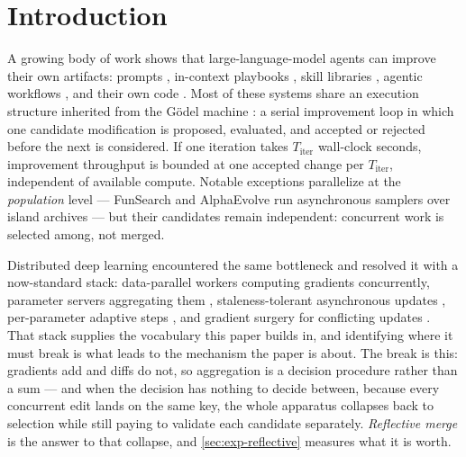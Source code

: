\documentclass{article}
\begin{document}

\section{Introduction}
\label{sec:intro}

A growing body of work shows that large-language-model agents can improve their own artifacts: prompts \citep{fernando2023promptbreeder,agrawal2025gepa}, in-context playbooks \citep{zhang2025ace}, skill libraries \citep{wang2023voyager,zheng2025skillweaver}, agentic workflows \citep{zhang2024aflow,hu2024adas}, and their own code \citep{zhang2025dgm,robeyns2025sica,yin2024godel}. Most of these systems share an execution structure inherited from the G\"odel machine \citep{schmidhuber2003godel}: a serial improvement loop in which one candidate modification is proposed, evaluated, and accepted or rejected before the next is considered. If one iteration takes $T_{\mathrm{iter}}$ wall-clock seconds, improvement throughput is bounded at one accepted change per $T_{\mathrm{iter}}$, independent of available compute. Notable exceptions parallelize at the \emph{population} level --- FunSearch and AlphaEvolve run asynchronous samplers over island archives \citep{romera2024funsearch,novikov2025alphaevolve} --- but their candidates remain independent: concurrent work is selected among, not merged.

Distributed deep learning encountered the same bottleneck and resolved it with a now-standard stack: data-parallel workers computing gradients concurrently, parameter servers aggregating them \citep{li2014parameterserver}, staleness-tolerant asynchronous updates \citep{niu2011hogwild}, per-parameter adaptive steps \citep{kingma2014adam}, and gradient surgery for conflicting updates \citep{yu2020pcgrad}. That stack supplies the vocabulary this paper builds in, and identifying where it must break is what leads to the mechanism the paper is about. The break is this: gradients add and diffs do not, so aggregation is a decision procedure rather than a sum --- and when the decision has nothing to decide between, because every concurrent edit lands on the same key, the whole apparatus collapses back to selection while still paying to validate each candidate separately. \emph{Reflective merge} is the answer to that collapse, and \cref{sec:exp-reflective} measures what it is worth.
\end{document}
